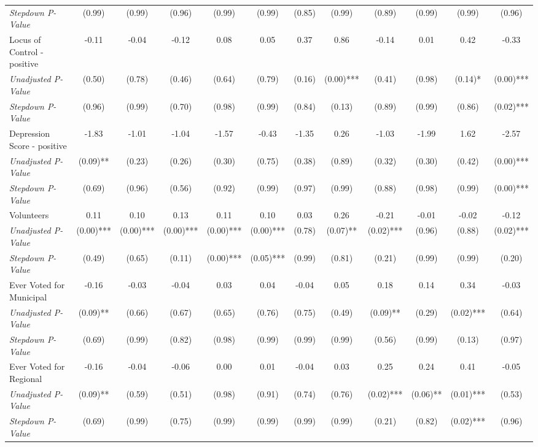 \begin{tabular}{l c c c c c c c c c c c}
\quad \textit{Stepdown P-Value} & (0.99) & (0.99) & (0.96) & (0.99) & (0.99) & (0.85) & (0.99) & (0.89) & (0.99) & (0.99) & (0.96) \\
Locus of Control - positive & -0.11 & -0.04 & -0.12 & 0.08 & 0.05 & 0.37 & 0.86 & -0.14 & 0.01 & 0.42 & -0.33 \\
\quad \textit{Unadjusted P-Value} & (0.50) & (0.78) & (0.46) & (0.64) & (0.79) & (0.16) & (0.00)*** & (0.41) & (0.98) & (0.14)* & (0.00)*** \\
\quad \textit{Stepdown P-Value} & (0.96) & (0.99) & (0.70) & (0.98) & (0.99) & (0.84) & (0.13) & (0.89) & (0.99) & (0.86) & (0.02)*** \\
Depression Score - positive & -1.83 & -1.01 & -1.04 & -1.57 & -0.43 & -1.35 & 0.26 & -1.03 & -1.99 & 1.62 & -2.57 \\
\quad \textit{Unadjusted P-Value} & (0.09)** & (0.23) & (0.26) & (0.30) & (0.75) & (0.38) & (0.89) & (0.32) & (0.30) & (0.42) & (0.00)*** \\
\quad \textit{Stepdown P-Value} & (0.69) & (0.96) & (0.56) & (0.92) & (0.99) & (0.97) & (0.99) & (0.88) & (0.98) & (0.99) & (0.00)*** \\
Volunteers & 0.11 & 0.10 & 0.13 & 0.11 & 0.10 & 0.03 & 0.26 & -0.21 & -0.01 & -0.02 & -0.12 \\
\quad \textit{Unadjusted P-Value} & (0.00)*** & (0.00)*** & (0.00)*** & (0.00)*** & (0.00)*** & (0.78) & (0.07)** & (0.02)*** & (0.96) & (0.88) & (0.02)*** \\
\quad \textit{Stepdown P-Value} & (0.49) & (0.65) & (0.11) & (0.00)*** & (0.05)*** & (0.99) & (0.81) & (0.21) & (0.99) & (0.99) & (0.20) \\
Ever Voted for Municipal & -0.16 & -0.03 & -0.04 & 0.03 & 0.04 & -0.04 & 0.05 & 0.18 & 0.14 & 0.34 & -0.03 \\
\quad \textit{Unadjusted P-Value} & (0.09)** & (0.66) & (0.67) & (0.65) & (0.76) & (0.75) & (0.49) & (0.09)** & (0.29) & (0.02)*** & (0.64) \\
\quad \textit{Stepdown P-Value} & (0.69) & (0.99) & (0.82) & (0.98) & (0.99) & (0.99) & (0.99) & (0.56) & (0.99) & (0.13) & (0.97) \\
Ever Voted for Regional & -0.16 & -0.04 & -0.06 & 0.00 & 0.01 & -0.04 & 0.03 & 0.25 & 0.24 & 0.41 & -0.05 \\
\quad \textit{Unadjusted P-Value} & (0.09)** & (0.59) & (0.51) & (0.98) & (0.91) & (0.74) & (0.76) & (0.02)*** & (0.06)** & (0.01)*** & (0.53) \\
\quad \textit{Stepdown P-Value} & (0.69) & (0.99) & (0.75) & (0.99) & (0.99) & (0.99) & (0.99) & (0.21) & (0.82) & (0.02)*** & (0.96) \\

\end{tabular}
